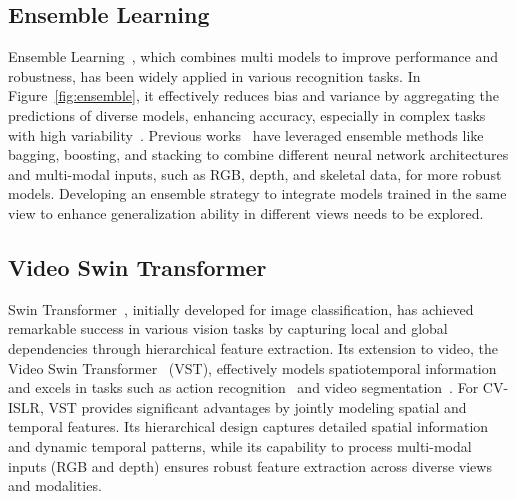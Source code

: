 \subsection{Ensemble Learning} 
Ensemble Learning~\cite{cao2020ensemble,zhou2022ensemble}, which combines multi models to improve performance and robustness, has been widely applied in various recognition tasks.
In Figure~\ref{fig:ensemble}, it effectively reduces bias and variance by aggregating the predictions of diverse models, enhancing accuracy, especially in complex tasks with high variability~\cite{sharma2022trbaggboost}.
Previous works~\cite{cao2020ensemble,yin2024grpose} have leveraged ensemble methods like bagging, boosting, and stacking to combine different neural network architectures and multi-modal inputs, such as RGB, depth, and skeletal data, for more robust models.
Developing an ensemble strategy to integrate models trained in the same view to enhance generalization ability in different views needs to be explored.


\subsection{Video Swin Transformer} 
Swin Transformer~\cite{liu2021swin}, initially developed for image classification, has achieved remarkable success in various vision tasks by capturing local and global dependencies through hierarchical feature extraction. Its extension to video, the Video Swin Transformer~\cite{liu2022video} (VST), effectively models spatiotemporal information and excels in tasks such as action recognition~\cite{li2023data} and video segmentation~\cite{shi2024dust}. For CV-ISLR, VST provides significant advantages by jointly modeling spatial and temporal features. Its hierarchical design captures detailed spatial information and dynamic temporal patterns, while its capability to process multi-modal inputs (RGB and depth) ensures robust feature extraction across diverse views and modalities.